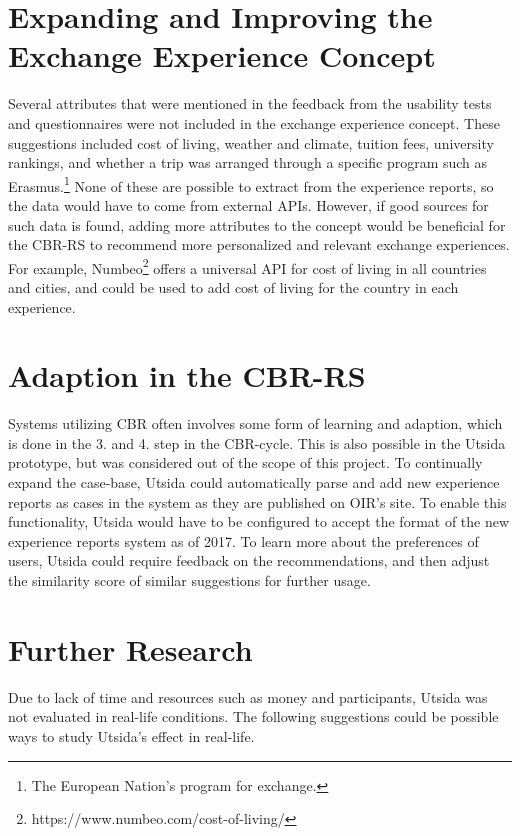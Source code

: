 \section{Expanding and Improving the Exchange Experience Concept}

Several attributes that were mentioned in the feedback from the usability tests and questionnaires were not included in the exchange experience concept. These suggestions included cost of living, weather and climate, tuition fees, university rankings, and whether a trip was arranged through a specific program such as Erasmus.\footnote{The European Nation's program for exchange.} None of these are possible to extract from the experience reports, so the data would have to come from external APIs. However, if good sources for such data is found, adding more attributes to the concept would be beneficial for the CBR-RS to recommend more personalized and relevant exchange experiences. For example, Numbeo\footnote{https://www.numbeo.com/cost-of-living/} offers a universal API for cost of living in all countries and cities, and could be used to add cost of living for the country in each experience. 

\section{Adaption in the CBR-RS}

Systems utilizing CBR often involves some form of learning and adaption, which is done in the 3. and 4. step in the CBR-cycle. This is also possible in the Utsida prototype, but was considered out of the scope of this project. To continually expand the case-base, Utsida could automatically parse and add new experience reports as cases in the system as they are published on OIR's site. To enable this functionality, Utsida would have to be configured to accept the format of the new experience reports system as of 2017. To learn more about the preferences of users, Utsida could require feedback on the recommendations, and then adjust the similarity score of similar suggestions for further usage.

\section{Further Research}

Due to lack of time and resources such as money and participants, Utsida was not evaluated in real-life conditions. The following suggestions could be possible ways to study Utsida's effect in real-life.


